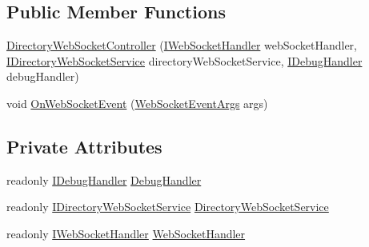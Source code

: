 \subsection*{Public Member Functions}
\begin{DoxyCompactItemize}
\item 
\mbox{\hyperlink{class_little_weeb_library_1_1_controllers_1_1_sub_controllers_1_1_directory_web_socket_controller_a46e3ddc55aed91ecf9ecf4e8b6849aa8}{Directory\+Web\+Socket\+Controller}} (\mbox{\hyperlink{interface_little_weeb_library_1_1_handlers_1_1_i_web_socket_handler}{I\+Web\+Socket\+Handler}} web\+Socket\+Handler, \mbox{\hyperlink{interface_little_weeb_library_1_1_services_1_1_i_directory_web_socket_service}{I\+Directory\+Web\+Socket\+Service}} directory\+Web\+Socket\+Service, \mbox{\hyperlink{interface_little_weeb_library_1_1_handlers_1_1_i_debug_handler}{I\+Debug\+Handler}} debug\+Handler)
\item 
void \mbox{\hyperlink{class_little_weeb_library_1_1_controllers_1_1_sub_controllers_1_1_directory_web_socket_controller_a2db42c05c620f5658a5b6e473581f84c}{On\+Web\+Socket\+Event}} (\mbox{\hyperlink{class_little_weeb_library_1_1_event_arguments_1_1_web_socket_event_args}{Web\+Socket\+Event\+Args}} args)
\end{DoxyCompactItemize}
\subsection*{Private Attributes}
\begin{DoxyCompactItemize}
\item 
readonly \mbox{\hyperlink{interface_little_weeb_library_1_1_handlers_1_1_i_debug_handler}{I\+Debug\+Handler}} \mbox{\hyperlink{class_little_weeb_library_1_1_controllers_1_1_sub_controllers_1_1_directory_web_socket_controller_abf69338892fe5271089f8f5f5f8f98e4}{Debug\+Handler}}
\item 
readonly \mbox{\hyperlink{interface_little_weeb_library_1_1_services_1_1_i_directory_web_socket_service}{I\+Directory\+Web\+Socket\+Service}} \mbox{\hyperlink{class_little_weeb_library_1_1_controllers_1_1_sub_controllers_1_1_directory_web_socket_controller_abc26a62941c830a9d2ac9a99da75090c}{Directory\+Web\+Socket\+Service}}
\item 
readonly \mbox{\hyperlink{interface_little_weeb_library_1_1_handlers_1_1_i_web_socket_handler}{I\+Web\+Socket\+Handler}} \mbox{\hyperlink{class_little_weeb_library_1_1_controllers_1_1_sub_controllers_1_1_directory_web_socket_controller_aeb38c7591cca93339c43ed5b1424b790}{Web\+Socket\+Handler}}
\end{DoxyCompactItemize}


